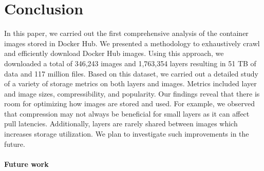 \section{Conclusion}
\label{sec:conclusion}

In this paper, we carried out the first comprehensive analysis of the container images
stored in Docker Hub.
%
We presented a methodology to exhaustively crawl and efficiently download Docker Hub
images. Using this approach, we downloaded a total of 346,243 images and 1,763,354 layers
resulting in 51 TB of data and
117 million files.
%
Based on this dataset, we carried out a detailed study of a variety of storage
metrics on both layers and images. Metrics included layer and image sizes, compressibility,
and popularity. Our findings reveal that there is room for optimizing how images
are stored and used. For example, we observed that compression may not always be beneficial for small
layers as it can affect pull latencies. Additionally, layers are rarely shared between
images which increases storage utilization. We plan to investigate such improvements
in the future.

\paragraph{Future work}
%
%
%


%
%
